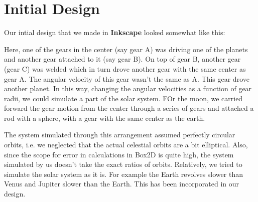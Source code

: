 \documentclass[12pt]{report}
\begin{document}
\section*{Initial Design}
Our intial design that we made in \textbf{Inkscape} looked somewhat like this:
\begin{center}
\setlength\fboxsep{2pt}
\setlength\fboxrule{0pt}
\end{center}
Here, one of the gears in the center (say gear A) was driving one of the planets and another gear attached to it (say gear B). On top of gear B, another gear (gear C) was welded which in turn drove another gear with the same center as gear A. The angular velocity of this gear wasn't the same as A. This gear drove another planet. In this way, changing the angular velocities as a function of gear radii, we could simulate a part of the solar system. FOr the moon, we carried forward the gear motion from the center through a series of gears and attached a rod with a sphere, with a gear with the same center as the earth.

The system simulated through this arrangement assumed perfectly circular orbits, i.e. we neglected that the actual celestial orbits are a bit elliptical. Also, since the scope for error in calculations in Box2D is quite high, the system simulated by us doesn't take the exact ratios of orbits. Relatively, we tried to simulate the solar system as it is. For example the Earth revolves slower than Venus and Jupiter slower than the Earth. This has been incorporated in our design.
\end{document}

